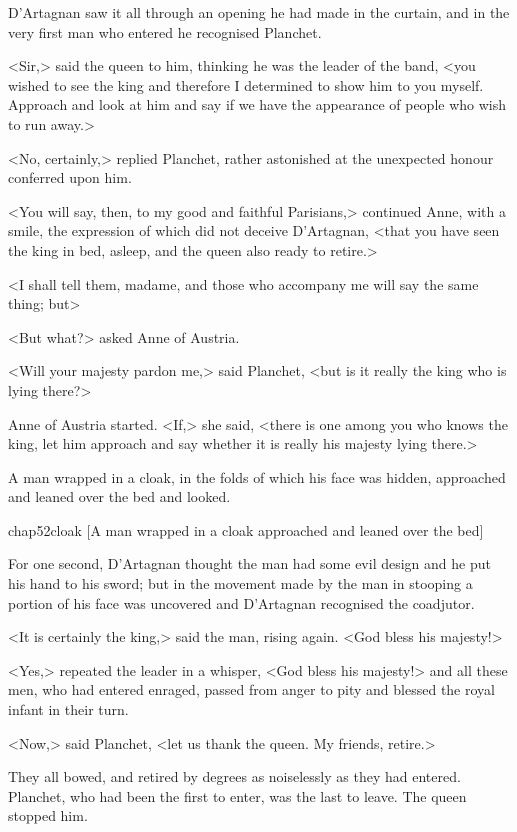 D'Artagnan saw it all through an opening he had made in the curtain, and in the very first man who entered he recognised Planchet.

<Sir,> said the queen to him, thinking he was the leader of the band, <you wished to see the king and therefore I determined to show him to you myself. Approach and look at him and say if we have the appearance of people who wish to run away.>

<No, certainly,> replied Planchet, rather astonished at the unexpected honour conferred upon him.

<You will say, then, to my good and faithful Parisians,> continued Anne, with a smile, the expression of which did not deceive D'Artagnan, <that you have seen the king in bed, asleep, and the queen also ready to retire.>

<I shall tell them, madame, and those who accompany me will say the same thing; but\longdash>

<But what?> asked Anne of Austria.

<Will your majesty pardon me,> said Planchet, <but is it really the king who is lying there?>

Anne of Austria started. <If,> she said, <there is one among you who knows the king, let him approach and say whether it is really his majesty lying there.>

A man wrapped in a cloak, in the folds of which his face was hidden, approached and leaned over the bed and looked.

\begin{bwbigpic}
	[\basicscale] 
	{chap52cloak}
	[A man wrapped in a cloak approached and leaned over the bed]
\end{bwbigpic}

For one second, D'Artagnan thought the man had some evil design and he put his hand to his sword; but in the movement made by the man in stooping a portion of his face was uncovered and D'Artagnan recognised the coadjutor.

<It is certainly the king,> said the man, rising again. <God bless his majesty!>

<Yes,> repeated the leader in a whisper, <God bless his majesty!> and all these men, who had entered enraged, passed from anger to pity and blessed the royal infant in their turn.

<Now,> said Planchet, <let us thank the queen. My friends, retire.>

They all bowed, and retired by degrees as noiselessly as they had entered. Planchet, who had been the first to enter, was the last to leave. The queen stopped him.

